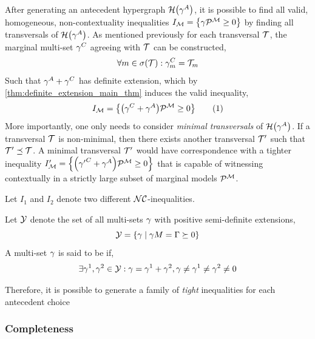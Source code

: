 \documentclass[aps, 10pt, english, twoside, pra, nofootinbib, longbibliography]{revtex4-1}
\begin{document}
    After generating an antecedent hypergraph $\hgraph\br{\ga^A}$, it is possible to find all valid, homogeneous, non-contextuality inequalities $I_\mscenario = \bc{ \ga \tcdot \probvec^{\mscenario} \geq 0}$ by finding all transversals of $\hgraph\br{\ga^A}$. As mentioned previously for each transversal $\mathcal{T}$, the marginal multi-set $\gamma^C$ agreeing with $\mathcal{T}$ can be constructed,
    \[ \forall m \in \supp{\trans} : \ga^C_{m} = \trans_m \]
    Such that $\gamma^A + \gamma^C$ has definite extension, which by \cref{thm:definite_extension_main_thm} induces the valid inequality,
    \[ I_\mscenario = \bc{\br{\ga^C + \ga^A} \tcdot \probvec^{\mscenario} \geq 0} \eq \label{eq:transversal_inequality}\]
    More importantly, one only needs to consider \textit{minimal transversals} of $\hgraph\br{\ga^A}$. If a transversal $\mathcal{T}$ is non-minimal, then there exists another transversal $\mathcal{T}'$ such that $\mathcal{T}' \preceq \mathcal{T}$. A minimal transversal $\mathcal{T}'$ would have correspondence with a tighter inequality $I_\mscenario' = \bc{\br{{\ga'}^C + \ga^A} \tcdot \probvec^{\mscenario} \geq 0}$ that is capable of witnessing contextually in a strictly large subset of marginal models $\probvec^{\mscenario}$. \\

    \begin{definition}
        Let $I_1$ and $I_2$ denote two different $\mathcal{NC}$-inequalities.
    \end{definition}

    \begin{definition}
        Let $\mathcal{Y}$ denote the set of all multi-sets $\gamma$ with positive semi-definite extensions,
        \[ \s{Y} = \bc{\ga \mid \ga \tcdot M = \Ga \succeq 0} \]
        A multi-set $\gamma$ is said to be  if,
        \[ \exists \gamma^1, \gamma^2 \in \mathcal{Y} : \gamma = \gamma^1 + \gamma^2, \gamma \neq \gamma^1 \neq \gamma^2 \neq 0 \]
    \end{definition}


    Therefore, it is possible to generate a family of \textit{tight} inequalities for each antecedent choice

    \subsubsection{Completeness}
    \label{sec:completeness_dep}
     \\
     \\
     \\
    \begin{theorem}
        \label{thm:completeness}
    \end{theorem}
\end{document}
